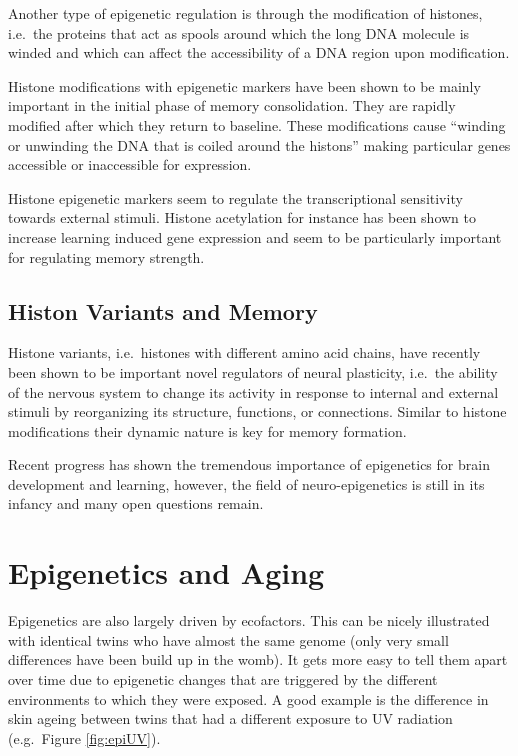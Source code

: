 \documentclass[
  11pt,
]{book}
\begin{document}
Another type of epigenetic regulation is through the modification of histones, i.e.~the proteins that act as spools around which the long DNA molecule is winded and which can affect the accessibility of a DNA region upon modification.

Histone modifications with epigenetic markers have been shown to be mainly important in the initial phase of memory consolidation. They are rapidly modified after which they return to baseline. These modifications cause ``winding or unwinding the DNA that is coiled around the histons'' making particular genes accessible or inaccessible for expression.

Histone epigenetic markers seem to regulate the transcriptional sensitivity towards external stimuli. Histone acetylation for instance has been shown to increase learning induced gene expression and seem to be particularly important for regulating memory strength.

\hypertarget{histon-variants-and-memory}{%
\subsection{Histon Variants and Memory}\label{histon-variants-and-memory}}

Histone variants, i.e.~histones with different amino acid chains, have recently been shown to be important novel regulators of neural plasticity, i.e.~the ability of the nervous system to change its activity in response to internal and external stimuli by reorganizing its structure, functions, or connections. Similar to histone modifications their dynamic nature is key for memory formation.

Recent progress has shown the tremendous importance of epigenetics for brain development and learning, however, the field of neuro-epigenetics is still in its infancy and many open questions remain.

\hypertarget{epigenetics-and-aging}{%
\section{Epigenetics and Aging}\label{epigenetics-and-aging}}

Epigenetics are also largely driven by ecofactors. This can be nicely illustrated with identical twins who have almost the same genome (only very small differences have been build up in the womb). It gets more easy to tell them apart over time due to epigenetic changes that are triggered by the different environments to which they were exposed. A good example is the difference in skin ageing between twins that had a different exposure to UV radiation (e.g.~Figure \ref{fig:epiUV}).
\end{document}
